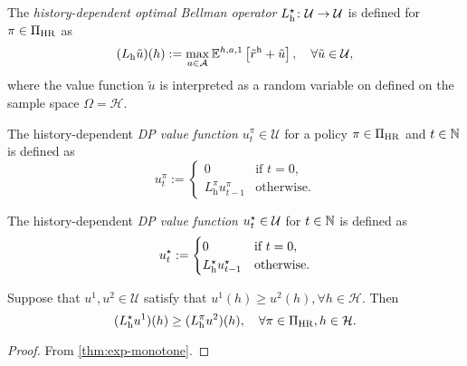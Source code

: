 \begin{definition}\label{def:DPhopt} 
The \emph{history-dependent optimal Bellman operator} $L_{\mathrm{h}}^{\star} \colon \mathcal{U} \to \mathcal{U}$ is defined for $\pi\in \Pi_{\mathrm{HR}}$ as
  \[
    (L_{\mathrm{h}} \tilde{u}) (h)
    :=
    \max_{a\in \mathcal{A}} \mathbb{E}^{h, a, 1} \left[ \tilde{r}^{\mathrm{h}} + \tilde{u} \right], \quad \forall \tilde{u} \in \mathcal{U},
  \]
  where the value function $\tilde{u}$ is interpreted as a random variable on defined on the sample space $\Omega = \mathcal{H}$.
  \leanok
\end{definition}

\begin{definition} \label{def:u-dp-pi}
  The history-dependent \emph{DP value function} $u_t^{\pi} \in \mathcal{U}$ for a policy $\pi\in \Pi_{\mathrm{HR}}$ and $t\in \mathbb{N}$ is defined as
  \[
   u_t^{\pi} :=
   \begin{cases}
     0 &\text{if } t = 0, \\
     L_{\mathrm{h}}^{\pi} u_{t-1}^{\pi} &\text{otherwise}.
   \end{cases}
 \]
 \leanok
\end{definition}

\begin{definition} \label{def:u-dp-opt}
  The history-dependent \emph{DP value function} $u_t^{\star} \in \mathcal{U}$ for $t\in \mathbb{N}$ is defined as
  \[
   u_t^{\star}  :=
   \begin{cases}
     0 &\text{if } t = 0, \\
     L_{\mathrm{h}}^{\star} u_{t-1}^{\star} &\text{otherwise}.
   \end{cases}
 \]
 \leanok
\end{definition}

\begin{lemma}\label{thm:dp-opt-ge-dp-pi}
  Suppose that $u^1, u^2 \in \mathcal{U}$ satisfy that $u^1(h) \ge u^2(h), \forall h\in \mathcal{H}$. Then
  \[
   (L_{\mathrm{h}}^{\star} u^1)(h) \ge  
   (L_{\mathrm{h}}^{\pi} u^2)(h), \quad \forall \pi\in \Pi_{\mathrm{HR}}, h\in \mathcal{H}.
  \]
\end{lemma}
\begin{proof}
  From \cref{thm:exp-monotone}.
\end{proof}

